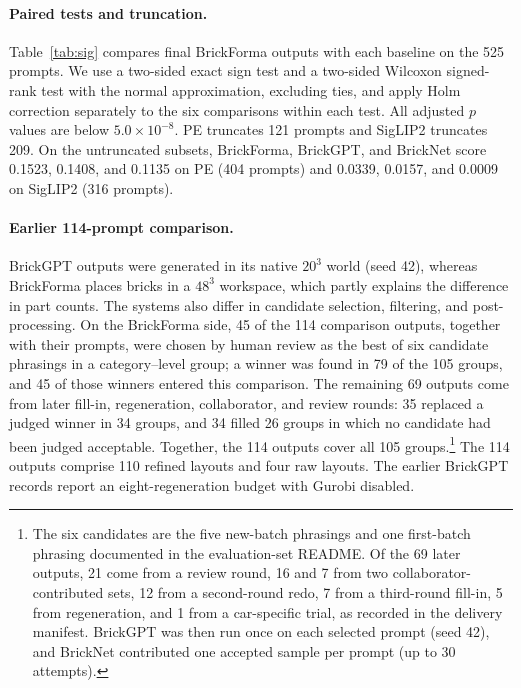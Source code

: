 \paragraph{Paired tests and truncation.}
Table~\ref{tab:sig} compares final BrickForma outputs with each baseline on the 525 prompts. We use a two-sided exact sign test and a two-sided Wilcoxon signed-rank test with the normal approximation, excluding ties, and apply Holm correction separately to the six comparisons within each test. All adjusted $p$ values are below $5.0{\times}10^{-8}$. PE truncates 121 prompts and SigLIP2 truncates 209. On the untruncated subsets, BrickForma, BrickGPT, and BrickNet score 0.1523, 0.1408, and 0.1135 on PE (404 prompts) and 0.0339, 0.0157, and 0.0009 on SigLIP2 (316 prompts).



\paragraph{Earlier 114-prompt comparison.} BrickGPT outputs were generated in its native $20^3$ world (seed 42), whereas BrickForma places bricks in a $48^3$ workspace, which partly explains the difference in part counts. The systems also differ in candidate selection, filtering, and post-processing. On the BrickForma side, 45 of the 114 comparison outputs, together with their prompts, were chosen by human review as the best of six candidate phrasings in a category--level group; a winner was found in 79 of the 105 groups, and 45 of those winners entered this comparison. The remaining 69 outputs come from later fill-in, regeneration, collaborator, and review rounds: 35 replaced a judged winner in 34 groups, and 34 filled 26 groups in which no candidate had been judged acceptable. Together, the 114 outputs cover all 105 groups.\footnote{The six candidates are the five new-batch phrasings and one first-batch phrasing documented in the evaluation-set README. Of the 69 later outputs, 21 come from a review round, 16 and 7 from two collaborator-contributed sets, 12 from a second-round redo, 7 from a third-round fill-in, 5 from regeneration, and 1 from a car-specific trial, as recorded in the delivery manifest. BrickGPT was then run once on each selected prompt (seed 42), and BrickNet contributed one accepted sample per prompt (up to 30 attempts).} The 114 outputs comprise 110 refined layouts and four raw layouts. The earlier BrickGPT records report an eight-regeneration budget with Gurobi disabled.

